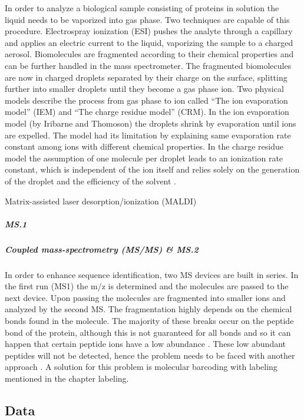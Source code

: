 \documentclass[
  11pt,
]{article}
\begin{document}
In order to analyze a biological sample consisting of proteins in
solution the liquid needs to be vaporized into gas phase. Two techniques
are capable of this procedure. Electrospray ionization (ESI) pushes the
analyte through a capillary and applies an electric current to the
liquid, vaporizing the sample to a charged aerosol. Biomolecules are
fragmented according to their chemical properties and can be further
handled in the mass spectrometer. The fragmented biomolecules are now in
charged droplets separated by their charge on the surface, splitting
further into smaller droplets until they become a gas phase ion. Two
physical models describe the process from gas phase to ion called ``The
ion evaporation model'' (IEM) and ``The charge residue model'' (CRM). In
the ion evaporation model (by Iribarne and Thomoson) the droplets shrink
by evaporation until ions are expelled. The model had its limitation by
explaining same evaporation rate constant among ions with different
chemical properties. In the charge residue model the assumption of one
molecule per droplet leads to an ionization rate constant, which is
independent of the ion itself and relies solely on the generation of the
droplet and the efficiency of the solvent \citep{Wilm2011}.

Matrix-assisted laser desorption/ionization (MALDI)

\hypertarget{ms.1}{%
\subparagraph{MS.1}\label{ms.1}}

\hypertarget{coupled-mass-spectrometry-msms-ms.2}{%
\subparagraph{Coupled mass-spectrometry (MS/MS) \&
MS.2}\label{coupled-mass-spectrometry-msms-ms.2}}

In order to enhance sequence identification, two MS devices are built in
series. In the first run (MS1) the m/z is determined and the molecules
are passed to the next device. Upon passing the molecules are fragmented
into smaller ions and analyzed by the second MS. The fragmentation
highly depends on the chemical bonds found in the molecule. The majority
of these breaks occur on the peptide bond of the protein, although this
is not guaranteed for all bonds and so it can happen that certain
peptide ions have a low abundance \citep{Budnik2018}. These low abundant
peptides will not be detected, hence the problem needs to be faced with
another approach . A solution for this problem is molecular barcoding
with labeling mentioned in the chapter labeling.

\hypertarget{data}{%
\subsection{Data}\label{data}}
\end{document}
